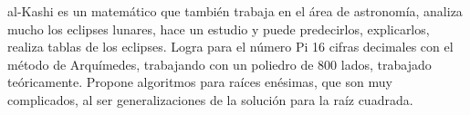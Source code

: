 al-Kashi es un matemático que también trabaja en el área de astronomía, analiza mucho los eclipses lunares, hace un estudio y puede predecirlos, explicarlos, realiza tablas de los eclipses. Logra para el número Pi 16 cifras decimales con el método de Arquímedes, trabajando con un poliedro de 800 lados, trabajado teóricamente. Propone algoritmos para raíces enésimas, que son muy complicados, al ser generalizaciones de la solución para la raíz cuadrada.